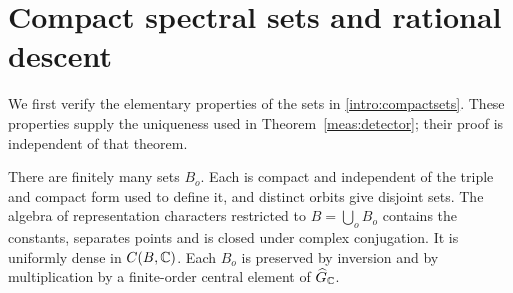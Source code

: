 \section{Compact spectral sets and rational descent}\label{desc:section}

We first verify the elementary properties of the sets in
\eqref{intro:compactsets}. These properties supply the uniqueness used in
Theorem~\ref{meas:detector}; their proof is independent of that theorem.

\begin{lemma}\label{desc:compactsets}
There are finitely many sets $B_o$. Each is compact and independent of
the triple and compact form used to define it, and distinct orbits give
disjoint sets. The algebra of representation characters restricted to
$B=\bigcup_oB_o$ contains the constants, separates points and is closed
under complex conjugation. It is uniformly dense in $C(B,\mathbb C)$.
Each $B_o$ is preserved by inversion and by multiplication by a
finite-order central element of $\widehat G_\mathbb C$.
\end{lemma}

